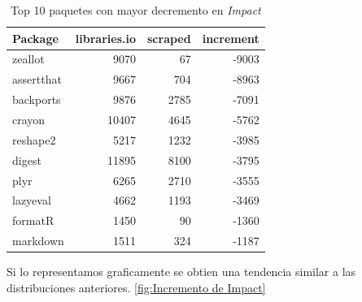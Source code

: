 \begin{table}
    \begin{center}
        \begin{tabular}{|l|r|r|r|}
            \hline
            \textbf{Package} & \textbf{libraries.io} & \textbf{scraped} & \textbf{increment} \\
            \hline
            zeallot          & 9070                  & 67               & -9003              \\
            assertthat       & 9667                  & 704              & -8963              \\
            backports        & 9876                  & 2785             & -7091              \\
            crayon           & 10407                 & 4645             & -5762              \\
            reshape2         & 5217                  & 1232             & -3985              \\
            digest           & 11895                 & 8100             & -3795              \\
            plyr             & 6265                  & 2710             & -3555              \\
            lazyeval         & 4662                  & 1193             & -3469              \\
            formatR          & 1450                  & 90               & -1360              \\
            markdown         & 1511                  & 324              & -1187              \\
            \hline
        \end{tabular}
    \end{center}
\caption{Top 10 paquetes con mayor decremento en \textit{Impact}}
\label{tab:Top 10 paquetes con mayor decremento en Impact}
\end{table}


Si lo representamos graficamente se obtien una tendencia similar a las distribuciones anteriores. \ref{fig:Incremento de Impact}

